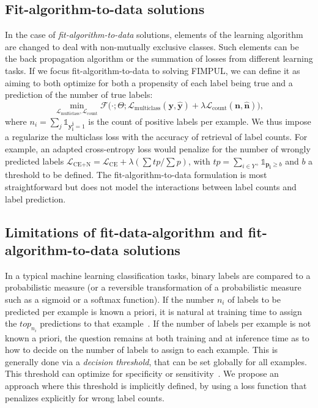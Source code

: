 \subsection{Fit-algorithm-to-data solutions}
\label{section:background:fitalgorithm}
In the case of \emph{fit-algorithm-to-data} solutions, elements of the learning algorithm are changed to deal with non-mutually exclusive classes. Such elements can be the back propagation algorithm or the summation of losses from different learning tasks.
If we focus fit-algorithm-to-data to solving FIMPUL, we can define it as aiming to both optimize for both a propensity of each label being true and a prediction of the number of true labels:
%
\begin{equation}
\underset{\mathcal{L}_{\text {multiclass}}, \mathcal{L}_{\text {count}}}
{\min} \mathcal{F}\big(\cdot ; \Theta; \mathcal{L}_{\text {multiclass}}
(\mathbf{y}, \hat{\mathbf{y}}) + \lambda \mathcal{L}_{\text {count}}
(\mathbf{n}, \hat{\mathbf{n}})\big),
\end{equation}
%
where \(n_i = \sum_j \mathds{1}_{\mathbf{y_i^j} = 1}\) is the count of
positive labels per example. We thus impose a regularize the multiclass loss with the accuracy of retrieval of label counts.
For example, an adapted cross-entropy loss would penalize for the number of wrongly predicted
labels \(\mathcal{L}_{\text {CE+N}}= \mathcal{L}_{\text {CE}} + \lambda (\sum
tp / \sum p)\), with \(t p=\sum_{i \in Y^{+}} \mathds{1}_{\mathbf{p_i} \geq
b}\) and \(b\) a threshold to be defined. The fit-algorithm-to-data
formulation is most straightforward but does not model the interactions between label counts and label prediction.

\subsection{Limitations of fit-data-algorithm and fit-algorithm-to-data solutions}
\label{section:background:limitations}

In a typical machine learning classification tasks, binary labels are compared to a probabilistic measure (or a reversible
transformation of a probabilistic measure such as a sigmoid or a softmax
function). If the number $n_i$ of labels to be predicted per
example is known a priori, it is natural at training time to assign the $top_{n_i}$ predictions
to that example~\cite{lossTopKError, topKmulticlassSVM}. If the number of
labels per example is not known a priori, the question remains at both training and at inference time
as to how to decide on the number of labels to assign to each
example. This is generally done via a \emph{decision threshold}, that can be set globally for all
examples. This threshold can optimize for specificity or
sensitivity~\cite{decisionThreshold}. We propose an approach where this threshold
is implicitly defined, by using a loss function that penalizes explicitly for wrong label counts.

